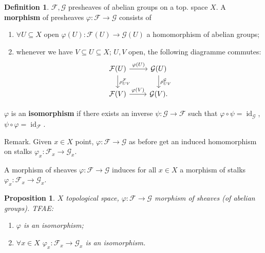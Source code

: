 \documentclass[12pt]{article}
\DeclareMathOperator{\id}{id}
\newtheorem*{proposition}{Proposition}
\theoremstyle{definition}
\newtheorem*{definition}{Definition}
\theoremstyle{remark}
\begin{document}
\begin{definition}
$\mathcal{F},\mathcal{G}$ presheaves of abelian groups on a top. space $X$. A \textbf{morphism} of presheaves $\varphi:\mathcal{F}\rightarrow\mathcal{G}$ consists of
\begin{enumerate}[label=\arabic*)]
\item $\forall U\subseteq X$ open $\varphi(U):\mathcal{F}(U)\rightarrow\mathcal{G}(U)$ a homomorphism of abelian groups;
\item whenever we have $V\subseteq U\subseteq X$; $U,V$ open, the following diagramme commutes:
\[
\begin{tikzcd}
\mathcal{F}(U)\arrow[r,"\varphi(U)"]\arrow[d,"\rho_{UV}^{\mathcal{F}}"]&\mathcal{G}(U)\arrow[d,"\rho_{UV}^{\mathcal{G}}"]\\
\mathcal{F}(V)\arrow[r,"\varphi(V)"]&\mathcal{G}(V).
\end{tikzcd}
\]
\end{enumerate}

$\varphi$ is an \textbf{isomorphism} if there exists an inverse $\psi:\mathcal{G}\rightarrow\mathcal{F}$ such that $\varphi\circ\psi=\id_{\mathcal{G}}$, $\psi\circ\varphi=\id_{\mathcal{F}}$.
\end{definition}

Remark. Given $x\in X$ point, $\varphi:\mathcal{F}\rightarrow\mathcal{G}$ as before get an induced homomorphism on stalks $\varphi_x:\mathcal{F}_x\rightarrow\mathcal{G}_x$.

A morphism of sheaves $\varphi:\mathcal{F}\rightarrow\mathcal{G}$ induces for all $x\in X$ a morphism of stalks $\varphi_x:\mathcal{F}_x\rightarrow\mathcal{G}_x$.

\begin{proposition}
$X$ topological space, $\varphi:\mathcal{F}\rightarrow\mathcal{G}$ morphism of sheaves (of abelian groups). TFAE:
\begin{enumerate}[label=\arabic*)]
\item $\varphi$ is an isomorphism;
\item $\forall x\in X$ $\varphi_x:\mathcal{F}_x\rightarrow\mathcal{G}_x$ is an isomorphism.
\end{enumerate}
\end{proposition}
\end{document}
